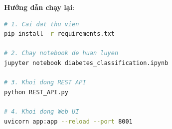 \documentclass[12pt, a4paper]{article}
\begin{document}
\textbf{Hướng dẫn chạy lại}:
\begin{lstlisting}[language=bash]
# 1. Cai dat thu vien
pip install -r requirements.txt

# 2. Chay notebook de huan luyen
jupyter notebook diabetes_classification.ipynb

# 3. Khoi dong REST API
python REST_API.py

# 4. Khoi dong Web UI
uvicorn app:app --reload --port 8001
\end{lstlisting}
\end{document}
